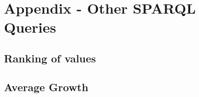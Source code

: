 \section{Appendix - Other SPARQL Queries}

\subsection{Ranking of values}


\subsection{Average Growth}
